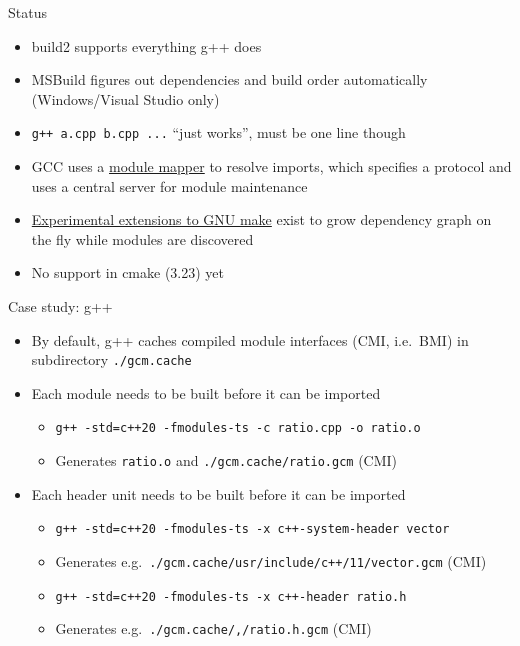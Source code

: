 \begin{frame}[fragile]
    \begin{block}{Status}
      \begin{itemize}
        \item build2 supports everything g++ does
        \item MSBuild figures out dependencies and build order automatically (Windows/Visual Studio only)
        \item \texttt{g++ a.cpp b.cpp ...} ``just works'', must be one line though
        \item GCC uses a \href{https://wg21.link/P1184}{module mapper} to resolve imports, which specifies a protocol and uses a central server for module maintenance
        \item \href{https://wg21.link/p1602}{Experimental extensions to GNU make} exist to grow dependency graph on the fly while modules are discovered
        \item No support in cmake (3.23) yet
      \end{itemize}
    \end{block}
\end{frame}

\begin{frame}[fragile]
    \begin{block}{Case study: g++}
      \begin{itemize}
        \item By default, g++ caches compiled module interfaces (CMI, i.e.\ BMI) in subdirectory \texttt{./gcm.cache}
        \item Each module needs to be built before it can be imported
        \begin{itemize}
          \item {\footnotesize \texttt{g++ -std=c++20 -fmodules-ts -c ratio.cpp -o ratio.o}}
          \item Generates \texttt{ratio.o} and \texttt{./gcm.cache/ratio.gcm} (CMI)
        \end{itemize}
        \item Each header unit needs to be built before it can be imported
        \begin{itemize}
          \item {\footnotesize \texttt{g++ -std=c++20 -fmodules-ts -x c++-system-header vector}}
          \item Generates e.g.\ \texttt{./gcm.cache/usr/include/c++/11/vector.gcm} (CMI)
          \item {\footnotesize \texttt{g++ -std=c++20 -fmodules-ts -x c++-header ratio.h}}
          \item Generates e.g.\ \texttt{./gcm.cache/,/ratio.h.gcm} (CMI)
        \end{itemize}
      \end{itemize}
    \end{block}
\end{frame}

